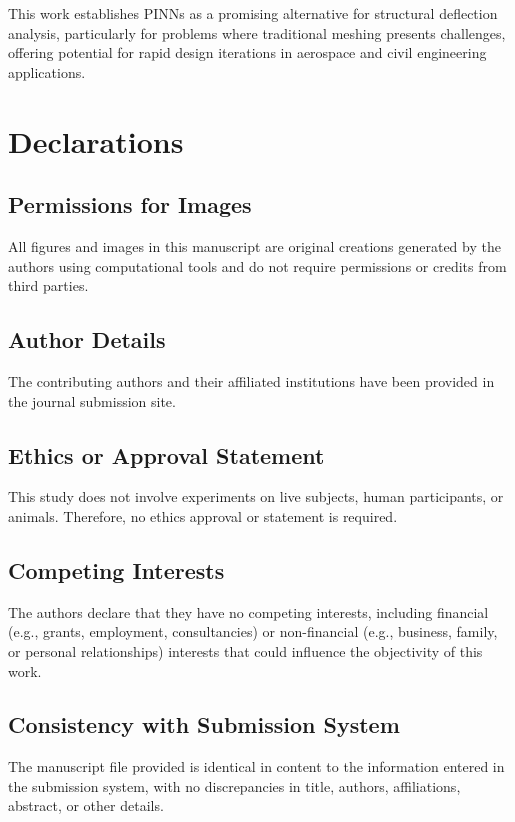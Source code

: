 \documentclass[twocolumn]{svjour3}
\begin{document}
	This work establishes PINNs as a promising alternative for structural deflection analysis, particularly for problems where traditional meshing presents challenges, offering potential for rapid design iterations in aerospace and civil engineering applications.
	
	\section{Declarations}
	\subsection{Permissions for Images}
	All figures and images in this manuscript are original creations generated by the authors using computational tools and do not require permissions or credits from third parties.
	\subsection{Author Details}
	The contributing authors and their affiliated institutions have been provided in the journal submission site.
	\subsection{Ethics or Approval Statement}
	This study does not involve experiments on live subjects, human participants, or animals. Therefore, no ethics approval or statement is required.
	\subsection{Competing Interests}
	The authors declare that they have no competing interests, including financial (e.g., grants, employment, consultancies) or non-financial (e.g., business, family, or personal relationships) interests that could influence the objectivity of this work.
	\subsection{Consistency with Submission System}
	The manuscript file provided is identical in content to the information entered in the submission system, with no discrepancies in title, authors, affiliations, abstract, or other details.
	

	
	
	
\end{document}
